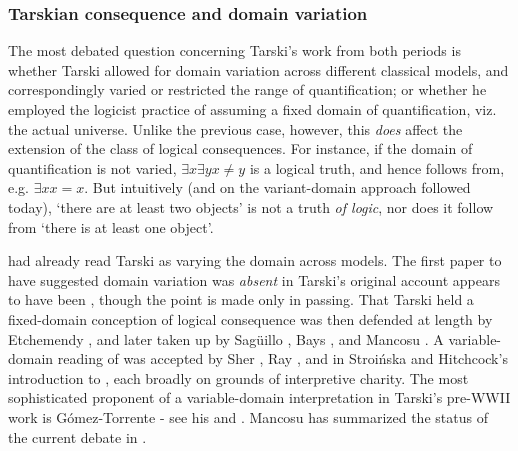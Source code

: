 \documentclass[]{article}
\begin{document}
\subsubsection{Tarskian consequence and domain variation}
The most debated question concerning Tarski's work from both periods is whether Tarski allowed for domain variation across different classical models, and correspondingly varied or restricted the range of quantification; or whether he employed the logicist practice of assuming a fixed domain of quantification, viz. the actual universe. Unlike the previous case, however, this \textit{does} affect the extension of the class of logical consequences. For instance, if the domain of quantification is not varied, $\exists x \exists y x \ne y$ is a logical truth, and hence follows from, e.g. $\exists x x = x$. But intuitively (and on the variant-domain approach followed today), `there are at least two objects' is not a truth \textit{of logic}, nor does it follow from `there is at least one object'.

\cite[325]{Church1956} had already read Tarski as varying the domain across models. The first paper to have suggested domain variation was \textit{absent} in Tarski's original account appears to have been \cite[43]{Corcoran1972}, though the point is made only in passing. That Tarski held a fixed-domain conception of logical consequence was then defended at length by Etchemendy \cite{Etchemendy1988} \cite{Etchemendy1990} \cite{Etchemendy2008}, and later taken up by Sag\"{u}illo \cite{Saguillo1997} \cite{Saguillo2009} \cite{Corcoran2011}, Bays \cite{Bays2001}, and Mancosu \cite{Mancosu2006} \cite{Mancosu2010a}. A variable-domain reading of \cite{Tarski2002} was accepted by Sher \cite{Sher1991} \cite{Sher1996}, Ray \cite{Ray1996}, and in Stroi\'{n}ska and Hitchcock's introduction to \cite{Tarski2002}, each broadly on grounds of interpretive charity. The most sophisticated proponent of a variable-domain interpretation in Tarski's pre-WWII work is G\'{o}mez-Torrente - see his \cite{Gomez-Torrente1996}  and \cite{Gomez-Torrente2009}. Mancosu has summarized the status of the current debate in \cite{Mancosu2010b}.
\end{document}
